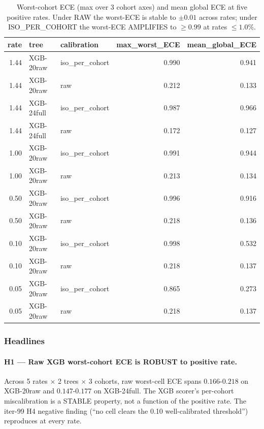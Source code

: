 \begin{table}[h]
\centering\small
\begin{tabular}{r l l r r}
\toprule
rate & tree & calibration & max\_worst\_ECE & mean\_global\_ECE \\
\midrule
1.44 & XGB-20raw  & iso\_per\_cohort & 0.990 & 0.941 \\
1.44 & XGB-20raw  & raw              & 0.212 & 0.133 \\
1.44 & XGB-24full & iso\_per\_cohort & 0.987 & 0.966 \\
1.44 & XGB-24full & raw              & 0.172 & 0.127 \\
1.00 & XGB-20raw  & iso\_per\_cohort & 0.991 & 0.944 \\
1.00 & XGB-20raw  & raw              & 0.213 & 0.134 \\
0.50 & XGB-20raw  & iso\_per\_cohort & 0.996 & 0.916 \\
0.50 & XGB-20raw  & raw              & 0.218 & 0.136 \\
0.10 & XGB-20raw  & iso\_per\_cohort & 0.998 & 0.532 \\
0.10 & XGB-20raw  & raw              & 0.218 & 0.137 \\
0.05 & XGB-20raw  & iso\_per\_cohort & 0.865 & 0.273 \\
0.05 & XGB-20raw  & raw              & 0.218 & 0.137 \\
\bottomrule
\end{tabular}
\caption{Worst-cohort ECE (max over 3 cohort axes) and mean global ECE at
five positive rates. Under RAW the worst-ECE is stable to $\pm 0.01$
across rates; under ISO\_PER\_COHORT the worst-ECE AMPLIFIES to $\ge
0.99$ at rates $\le 1.0\%$.}
\label{tab:p8-iter136-worst-ece}
\end{table}

\subsubsection{Headlines}

\paragraph{H1 --- Raw XGB worst-cohort ECE is ROBUST to positive rate.}
Across 5 rates $\times$ 2 trees $\times$ 3 cohorts, raw worst-cell ECE
spans $0.166$-$0.218$ on XGB-20raw and $0.147$-$0.177$ on XGB-24full.
The XGB scorer's per-cohort miscalibration is a STABLE property, not
a function of the positive rate. The iter-99 H4 negative finding
(``no cell clears the 0.10 well-calibrated threshold'') reproduces at
every rate.

